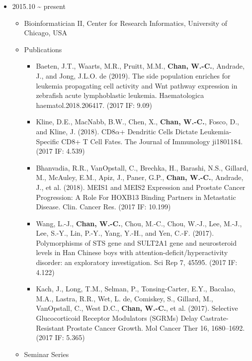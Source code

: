 \documentclass[]{article}
\providecommand{\tightlist}{%
  \setlength{\itemsep}{0pt}\setlength{\parskip}{0pt}}
\begin{document}
\begin{itemize}
\tightlist
\item
  2015.10 \textasciitilde{} present

  \begin{itemize}
  \tightlist
  \item
    Bioinformatician II, Center for Research Informatics, University of
    Chicago, USA
  \item
    Publications

    \begin{itemize}
    \tightlist
    \item
      Baeten, J.T., Waarts, M.R., Pruitt, M.M., \textbf{Chan, W.-C.},
      Andrade, J., and Jong, J.L.O. de (2019). The side population
      enriches for leukemia propagating cell activity and Wnt pathway
      expression in zebrafish acute lymphoblastic leukemia.
      Haematologica haematol.2018.206417. (2017 IF: 9.09)
    \item
      Kline, D.E., MacNabb, B.W., Chen, X., \textbf{Chan, W.-C.}, Fosco,
      D., and Kline, J. (2018). CD8\(\alpha\)+ Dendritic Cells Dictate
      Leukemia-Specific CD8+ T Cell Fates. The Journal of Immunology
      ji1801184. (2017 IF: 4.539)
    \item
      Bhanvadia, R.R., VanOpstall, C., Brechka, H., Barashi, N.S.,
      Gillard, M., McAuley, E.M., Apiz, J., Paner, G.P., \textbf{Chan,
      W.-C.}, Andrade, J., et al. (2018). MEIS1 and MEIS2 Expression and
      Prostate Cancer Progression: A Role For HOXB13 Binding Partners in
      Metastatic Disease. Clin. Cancer Res. (2017 IF: 10.199)
    \item
      Wang, L.-J., \textbf{Chan, W.-C.}, Chou, M.-C., Chou, W.-J., Lee,
      M.-J., Lee, S.-Y., Lin, P.-Y., Yang, Y.-H., and Yen, C.-F. (2017).
      Polymorphisms of STS gene and SULT2A1 gene and neurosteroid levels
      in Han Chinese boys with attention-deficit/hyperactivity disorder:
      an exploratory investigation. Sci Rep 7, 45595. (2017 IF: 4.122)
    \item
      Kach, J., Long, T.M., Selman, P., Tonsing-Carter, E.Y., Bacalao,
      M.A., Lastra, R.R., Wet, L. de, Comiskey, S., Gillard, M.,
      VanOpstall, C., West D.C., \textbf{Chan, W.-C.}, et al. (2017).
      Selective Glucocorticoid Receptor Modulators (SGRMs) Delay
      Castrate-Resistant Prostate Cancer Growth. Mol Cancer Ther 16,
      1680--1692. (2017 IF: 5.365)
    \end{itemize}
  \item
    Seminar Series


\end{itemize}
\end{itemize}
\end{document}
